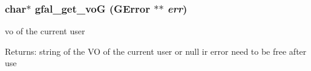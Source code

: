 \subsubsection{\setlength{\rightskip}{0pt plus 5cm}char$\ast$ gfal\_\-get\_\-vo\-G (GError $\ast$$\ast$ {\em err})}\label{gfal__voms__if_8c_04de197cd3250df8552015a45d0c7d24}


vo of the current user 

\begin{Desc}
\item[Returns:]string of the VO of the current user or null ir error need to be free after use \end{Desc}
